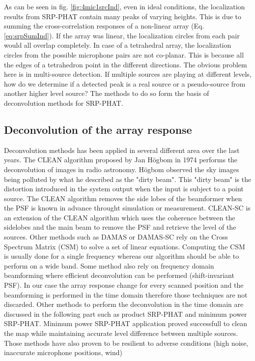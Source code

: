 As can be seen in fig. \ref{fig:4mic1srcInd}, even in ideal conditions, the localization results from SRP-PHAT contain many peaks of varying heights. This is due to summing the cross-correlation responses of a non-linear array (Eq. \ref{eq:srpSumInd}). If the array was linear, the localization circles from each pair would all overlap completely. In case of a tetrahedral array, the localization circles from the possible microphone pairs are not co-planar. This is because all the edges of a tetrahedron point in the different directions. The obvious problem here is in multi-source detection. If multiple sources are playing at different levels, how do we determine if a detected peak is a real source or a pseudo-source from another higher level source? The methods to do so form the basis of deconvolution methods for SRP-PHAT.

\subsection{Deconvolution of the array response}

Deconvolution methods has been applied in several different area over the last years. The CLEAN algorithm proposed by Jan Högbom in 1974 \cite{1974A&AS...15..417H} performs the deconvolution of images in radio astronomy. Högbom observed the sky images being polluted by what he described as the "dirty beam". This "dirty beam" is the distortion introduced in the system output when the input is subject to a point source. The CLEAN algorithm removes the side lobes of the beamformer when the PSF is known in advance throught simulation or measurement. CLEAN-SC is an extension of the CLEAN algorithm which uses the coherence between the sidelobes and the main beam to remove the PSF and retrieve the level of the sources. Other methods such as DAMAS or DAMAS-SC rely on the Cross Spectrum Matrix (CSM) to solve a set of linear equations. Computing the CSM is usually done for a single frequency whereas our algorithm should be able to perform on a wide band. Some method also rely on frequency domain beamforming where efficient deconvolution can be performed (shift-invariant PSF). In our case the array response change for every scanned position and the beamforming is performed in the time domain therefore those techniques are not discarded. Other methods to perform the deconvolution in the time domain are discussed in the following part such as product SRP-PHAT and minimum power SRP-PHAT. Minimum power SRP-PHAT application proved successfull to clean the map while maintaining accurate level difference between multiple sources. Those methods have also proven to be resilient to adverse conditions (high noise, inaccurate microphone positions, wind)

